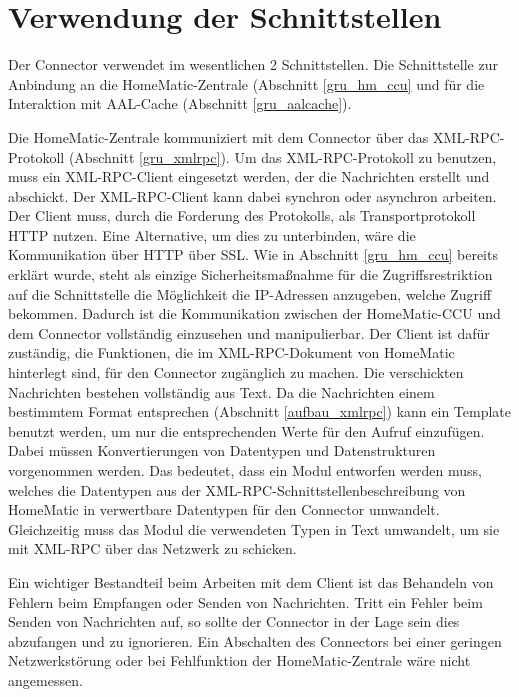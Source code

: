 \section{Verwendung der Schnittstellen}
\label{ana_schnitt}
Der Connector verwendet im wesentlichen 2 Schnittstellen.
Die Schnittstelle zur Anbindung an die HomeMatic-Zentrale (Abschnitt \ref{gru_hm_ccu} und
für die Interaktion mit AAL-Cache (Abschnitt \ref{gru_aalcache}).

Die HomeMatic-Zentrale kommuniziert mit dem Connector über das XML-RPC-Protokoll (Abschnitt \ref{gru_xmlrpc}).
Um das XML-RPC-Protokoll zu benutzen, muss ein XML-RPC-Client eingesetzt werden, der die
Nachrichten erstellt und abschickt.
Der XML-RPC-Client kann dabei synchron oder asynchron arbeiten.
Der Client muss, durch die Forderung des Protokolls, als Transportprotokoll HTTP nutzen.
Eine Alternative, um dies zu unterbinden, wäre die Kommunikation über HTTP über SSL.
Wie in Abschnitt \ref{gru_hm_ccu} bereits erklärt wurde, steht als einzige Sicherheitsmaßnahme für die
Zugriffsrestriktion auf die Schnittstelle die Möglichkeit die IP-Adressen anzugeben, welche Zugriff bekommen.
Dadurch ist die Kommunikation zwischen der HomeMatic-CCU und dem Connector vollständig einzusehen
und manipulierbar.
Der Client ist dafür zuständig, die Funktionen, die im XML-RPC-Dokument von HomeMatic \cite{homematic_xmlrpc}
hinterlegt sind, für den Connector zugänglich zu machen.
Die verschickten Nachrichten bestehen vollständig aus Text.
Da die Nachrichten einem bestimmtem Format entsprechen (Abschnitt \ref{aufbau_xmlrpc}) kann
ein Template benutzt werden, um nur die entsprechenden Werte für den Aufruf einzufügen.
Dabei müssen Konvertierungen von Datentypen und Datenstrukturen vorgenommen werden.
Das bedeutet, dass ein Modul entworfen werden muss, welches die Datentypen aus der XML-RPC-Schnittstellenbeschreibung
von HomeMatic in verwertbare Datentypen für den Connector umwandelt.
Gleichzeitig muss das Modul die verwendeten Typen in Text umwandelt, um sie mit XML-RPC über das Netzwerk zu schicken.

Ein wichtiger Bestandteil beim Arbeiten mit dem Client ist das Behandeln von Fehlern beim Empfangen oder
Senden von Nachrichten.
Tritt ein Fehler beim Senden von Nachrichten auf, so sollte der Connector in der Lage sein dies abzufangen
und zu ignorieren.
Ein Abschalten des Connectors bei einer geringen Netzwerkstörung oder bei Fehlfunktion der HomeMatic-Zentrale
wäre nicht angemessen.

